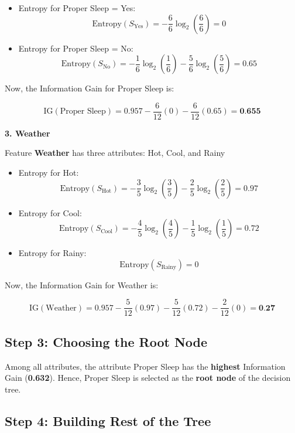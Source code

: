 \documentclass{article}
\begin{document}
\begin{itemize}
    \item Entropy for Proper Sleep = Yes:
    \[
    \text{Entropy}(S_{\text{Yes}}) = -\frac{6}{6} \log_2\left(\frac{6}{6}\right) = 0
    \]
    \item Entropy for Proper Sleep = No:
    \[
    \text{Entropy}(S_{\text{No}}) = -\frac{1}{6} \log_2\left(\frac{1}{6}\right) - \frac{5}{6} \log_2\left(\frac{5}{6}\right) = 0.65
    \]
\end{itemize}

Now, the Information Gain for Proper Sleep is:

\[
\text{IG}(\text{Proper Sleep}) = 0.957 - \frac{6}{12}(0) - \frac{6}{12}(0.65) = \textbf{0.655}
\]

\hspace{-20pt}
\textbf{3. Weather}

Feature \textbf{Weather} has three attributes: Hot, Cool, and Rainy

\begin{itemize}
    \item Entropy for Hot:
    \[
    \text{Entropy}(S_{\text{Hot}}) = -\frac{3}{5} \log_2\left(\frac{3}{5}\right) - \frac{2}{5} \log_2\left(\frac{2}{5}\right) = 0.97
    \]
    \item Entropy for Cool:
    \[
    \text{Entropy}(S_{\text{Cool}}) = -\frac{4}{5} \log_2\left(\frac{4}{5}\right) - \frac{1}{5} \log_2\left(\frac{1}{5}\right) = 0.72
    \]
    \item Entropy for Rainy:
    \[
    \text{Entropy}(S_{\text{Rainy}}) = 0
    \]
\end{itemize}

Now, the Information Gain for Weather is:

\[
\text{IG}(\text{Weather}) = 0.957 - \frac{5}{12}(0.97) - \frac{5}{12}(0.72) - \frac{2}{12}(0) = \textbf{0.27}
\]

\subsection*{Step 3: Choosing the Root Node}

Among all attributes, the attribute Proper Sleep has the \textbf{highest} Information Gain (\textbf{0.632}). Hence, Proper Sleep is selected as the \textbf{root node} of the decision tree.

\subsection*{Step 4: Building Rest of the Tree}
\end{document}
